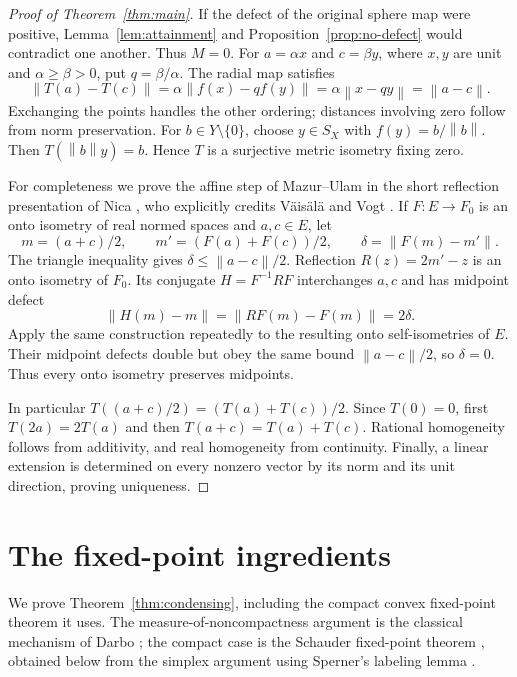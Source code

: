 \documentclass[11pt]{article}
\theoremstyle{remark}
\newcommand{\norm}[1]{\left\lVert#1\right\rVert}
\begin{document}
\begin{proof}[Proof of Theorem~\ref{thm:main}]
If the defect of the original sphere map were positive, Lemma~\ref{lem:attainment} and Proposition~\ref{prop:no-defect} would contradict one another. Thus $M=0$. For $a=\alpha x$ and $c=\beta y$, where $x,y$ are unit and $\alpha\ge\beta>0$, put $q=\beta/\alpha$. The radial map satisfies
\[
\norm{T(a)-T(c)}
=\alpha\norm{f(x)-qf(y)}
=\alpha\norm{x-qy}=\norm{a-c}.
\]
Exchanging the points handles the other ordering; distances involving zero follow from norm preservation. For $b\in Y\setminus\{0\}$, choose $y\in S_X$ with $f(y)=b/\norm{b}$. Then $T(\norm{b}y)=b$. Hence $T$ is a surjective metric isometry fixing zero.

For completeness we prove the affine step of Mazur--Ulam \cite{MazurUlam1932} in the short reflection presentation of Nica \cite{Nica2012}, who explicitly credits V\"ais\"al\"a and Vogt \cite{Vaisala2003,Vogt1973}. If $F:E\to F_0$ is an onto isometry of real normed spaces and $a,c\in E$, let
\[
m=(a+c)/2,\qquad m'=(F(a)+F(c))/2,
\qquad \delta=\norm{F(m)-m'}.
\]
The triangle inequality gives $\delta\le\norm{a-c}/2$. Reflection $R(z)=2m'-z$ is an onto isometry of $F_0$. Its conjugate $H=F^{-1}RF$ interchanges $a,c$ and has midpoint defect
\[
\norm{H(m)-m}=\norm{RF(m)-F(m)}=2\delta.
\]
Apply the same construction repeatedly to the resulting onto self-isometries of $E$. Their midpoint defects double but obey the same bound $\norm{a-c}/2$, so $\delta=0$. Thus every onto isometry preserves midpoints.

In particular $T((a+c)/2)=(T(a)+T(c))/2$. Since $T(0)=0$, first $T(2a)=2T(a)$ and then $T(a+c)=T(a)+T(c)$. Rational homogeneity follows from additivity, and real homogeneity from continuity. Finally, a linear extension is determined on every nonzero vector by its norm and its unit direction, proving uniqueness.
\end{proof}

\appendix
\section{The fixed-point ingredients}\label{sec:appendix}

We prove Theorem~\ref{thm:condensing}, including the compact convex fixed-point theorem it uses. The measure-of-noncompactness argument is the classical mechanism of Darbo \cite{Darbo1955}; the compact case is the Schauder fixed-point theorem \cite{Schauder1930}, obtained below from the simplex argument using Sperner's labeling lemma \cite{Sperner1928}.
\end{document}
